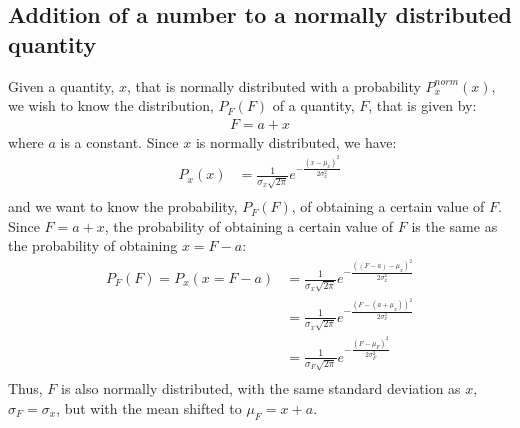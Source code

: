 \subsection{Addition of a number to a normally distributed quantity}
Given a quantity, $x$, that is normally distributed with a probability $P^{norm}_x(x)$, we wish to know the distribution, $P_F(F)$ of a quantity, $F$, that is given by:
\begin{align*}
F=a+x
\end{align*}
where $a$ is a constant. Since $x$ is normally distributed, we have:
\begin{align*}
P_x(x)&=\frac{1}{\sigma_x\sqrt{2\pi}}e^{-\frac{(x-\mu_x)^2}{2\sigma_x^2}}\\
\end{align*}
and we want to know the probability, $P_F(F)$, of obtaining a certain value of $F$. Since $F=a+x$, the probability of obtaining a certain value of $F$ is the same as the probability of obtaining $x=F-a$:
\begin{align}
\label{eqn:normsumconstant}
P_F(F)=P_x(x=F-a)&=\frac{1}{\sigma_x\sqrt{2\pi}}e^{-\frac{((F-a)-\mu_x)^2}{2\sigma_x^2}}\\
&=\frac{1}{\sigma_x\sqrt{2\pi}}e^{-\frac{(F-(a+\mu_x))^2}{2\sigma_x^2}}\\
&=\frac{1}{\sigma_F\sqrt{2\pi}}e^{-\frac{(F-\mu_F)^2}{2\sigma_F^2}}\\
\end{align}
Thus, $F$ is also normally distributed, with the same standard deviation as $x$, $\sigma_F=\sigma_x$, but with the mean shifted to $\mu_F=x+a$.
